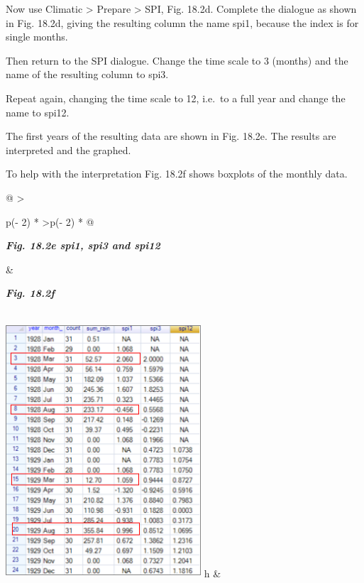 \documentclass[
  letterpaper,
  DIV=11,
  numbers=noendperiod]{scrreprt}
\begin{document}
Now use Climatic \textgreater{} Prepare \textgreater{} SPI, Fig. 18.2d.
Complete the dialogue as shown in Fig. 18.2d, giving the resulting
column the name spi1, because the index is for single months.

Then return to the SPI dialogue. Change the time scale to 3 (months) and
the name of the resulting column to spi3.

Repeat again, changing the time scale to 12, i.e.~to a full year and
change the name to spi12.

The first years of the resulting data are shown in Fig. 18.2e. The
results are interpreted and the graphed.

To help with the interpretation Fig. 18.2f shows boxplots of the monthly
data.

\begin{longtable}[]{@{}
  >{\raggedright\arraybackslash}p{(\columnwidth - 2\tabcolsep) * }
  >{\centering\arraybackslash}p{(\columnwidth - 2\tabcolsep) * }@{}}
\toprule\noalign{}
\begin{minipage}[b]{\linewidth}\raggedright
\textbf{\emph{Fig. 18.2e spi1, spi3 and spi12}}
\end{minipage} & \begin{minipage}[b]{\linewidth}\centering
\textbf{\emph{Fig. 18.2f}}
\end{minipage} \\
\midrule\noalign{}
\endhead
\bottomrule\noalign{}
\endlastfoot
\includegraphics[width=2.86491in,height=3.70342in]{figures/Fig18.2e.png}
h &

\end{longtable}
\end{document}
